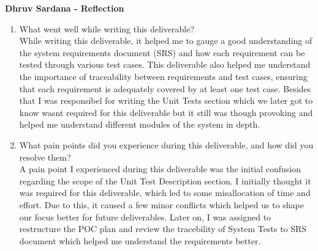 \documentclass[12pt, titlepage]{article}
\begin{document}
\textbf{Dhruv Sardana - Reflection}
\begin{enumerate}
  \item What went well while writing this deliverable?\\
  While writing this deliverable, it helped me to gauge a good understanding of the system requirements document (SRS) and how each requirement can be tested through various test cases. This deliverable also helped me understand the importance of traceability between requirements and test cases, ensuring that each requirement is adequately covered by at least one test case.
  Besides that I was responsibel for writing the Unit Tests section which we later got to know wasnt required for this deliverable but it still was though provoking and helped me understand different modules of the system in depth.
  
  \item What pain points did you experience during this deliverable, and how
    did you resolve them?\\
  A pain point I experienced during this deliverable was the initial confusion regarding the scope of the Unit Test Description section. 
  I initially thought it was required for this deliverable, which led to some misallocation of time and effort. Due to this, it caused a few minor conflicts which helped us to shape our focus better for future deliverables.
  Later on, I was assigned to restructure the POC plan and review the tracebility of System Tests to SRS document which helped me understand the requirements better.
 
\end{enumerate}
\end{document}
